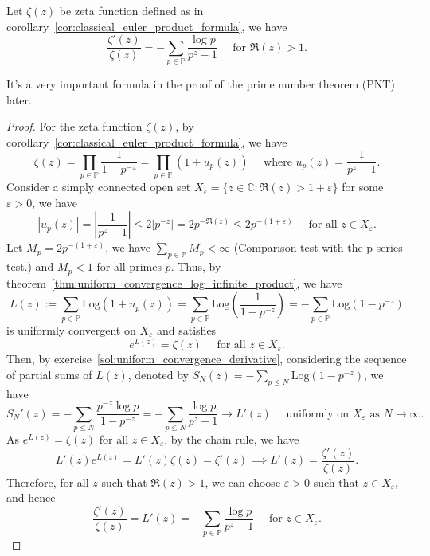\documentclass{elegantbook}
\begin{document}
\begin{corollary}
  Let $\zeta(z)$ be zeta function defined as in corollary~\ref{cor:classical_euler_product_formula}, we have
  \[
    \frac{\zeta'(z)}{\zeta(z)} = -\sum_{p\in\mathbb{P}} \frac{\log p}{p^{z}-1} \quad \text{ for } \Re(z)>1.
  \]
\end{corollary}

\begin{note}
  It's a very important formula in the proof of the prime number theorem (PNT) later.
\end{note}

\begin{proof}
  For the zeta function $\zeta(z)$, by corollary~\ref{cor:classical_euler_product_formula}, we have
  \[
    \zeta(z) = \prod_{p\in\mathbb{P}} \frac{1}{1 - p^{-z}} = \prod_{p\in\mathbb{P}} (1 + u_p(z)) \quad \text{ where } u_p(z) = \frac{1}{p^{z} - 1}.
  \]
  Consider a simply connected open set $X_{\varepsilon} = \{ z \in \mathbb{C} : \Re(z) > 1 + \varepsilon \}$ for some $\varepsilon > 0$, we have
  \[
    |u_p(z)| = \left| \frac{1}{p^{z} - 1} \right| \leq 2 |p^{-z}| = 2 p^{-\Re(z)} \leq 2 p^{-(1 + \varepsilon)} \quad \text{ for all } z \in X_{\varepsilon}.
  \]
  Let $M_p = 2 p^{-(1 + \varepsilon)}$, we have $\sum_{p\in\mathbb{P}} M_p < \infty$ (Comparison test with the p-series test.) and $M_p < 1$ for all primes $p$.
  Thus, by theorem~\ref{thm:uniform_convergence_log_infinite_product}, we have
  \[
    L(z) := \sum_{p\in\mathbb{P}} \mathrm{Log}(1 + u_p(z))= \sum_{p\in\mathbb{P}} \mathrm{Log}\left(\frac{1}{1 - p^{-z}}\right)= -\sum_{p\in\mathbb{P}} \mathrm{Log}(1 - p^{-z})
  \]
  is uniformly convergent on $X_{\varepsilon}$ and satisfies
  \[
    e^{L(z)} = \zeta(z) \quad \text{ for all } z \in X_{\varepsilon}.
  \]
  Then, by exercise~\ref{sol:uniform_convergence_derivative}, considering the sequence of partial sums of $L(z)$, denoted by $S_N(z) = -\sum_{p \leq N} \mathrm{Log}(1 - p^{-z})$, we have
  \[
    S_N'(z) = -\sum_{p \leq N} \frac{p^{-z} \log p}{1 - p^{-z}} = -\sum_{p \leq N} \frac{\log p}{p^{z} - 1} \to L'(z) \quad \text{ uniformly on } X_{\varepsilon} \text{ as } N \to \infty.
  \]
  As $e^{L(z)} = \zeta(z)$ for all $z \in X_{\varepsilon}$, by the chain rule, we have
  \[
    L'(z) e^{L(z)} = L'(z) \zeta(z) = \zeta'(z) \implies L'(z) = \frac{\zeta'(z)}{\zeta(z)}.
  \]
  Therefore, for all $z$ such that $\Re(z) > 1$, we can choose $\varepsilon > 0$ such that $z \in X_{\varepsilon}$, and hence
  \[
    \frac{\zeta'(z)}{\zeta(z)} = L'(z) = -\sum_{p\in\mathbb{P}} \frac{\log p}{p^{z} - 1} \quad \text{ for } z \in X_{\varepsilon}.
  \]
\end{proof}
\end{document}
